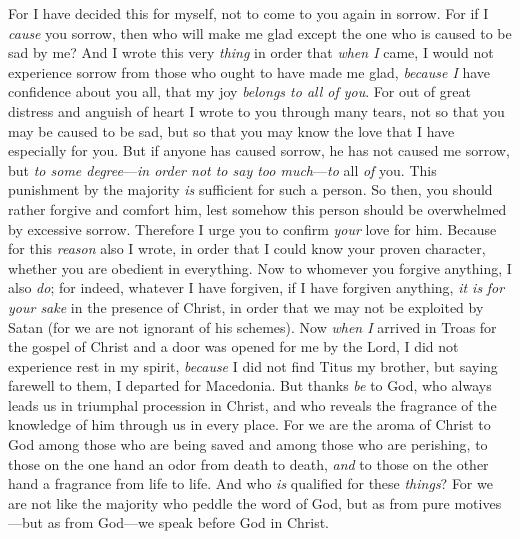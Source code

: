\begin{biblechapter} %
\verse For I have decided this for myself, not to come to you again in sorrow.
\verse For if I \textit{cause} you sorrow, then who will make me glad except the one who is caused to be sad by me?
\verse And I wrote this very \textit{thing} in order that \textit{when I} came, I would not experience sorrow from those who ought to have made me glad, \textit{because I} have confidence about you all, that my joy \textit{belongs to all of you}.
\verse For out of great distress and anguish of heart I wrote to you through many tears, not so that you may be caused to be sad, but so that you may know the love that I have especially for you.
 But if anyone has caused sorrow, he has not caused me sorrow, but \textit{to some degree}—\textit{in order not to say too much}—\textit{to} all \textit{of} you.
\verse This punishment by the majority \textit{is} sufficient for such a person.
\verse So then, you should rather forgive and comfort him, lest somehow this person should be overwhelmed by excessive sorrow.
\verse Therefore I urge you to confirm \textit{your} love for him.
\verse Because for this \textit{reason} also I wrote, in order that I could know your proven character, whether you are obedient in everything.
\verse Now to whomever you forgive anything, I also \textit{do}; for indeed, whatever I have forgiven, if I have forgiven anything, \textit{it is} \textit{for your sake} in the presence of Christ,
\verse in order that we may not be exploited by Satan (for we are not ignorant of his schemes).
 Now \textit{when I} arrived in Troas for the gospel of Christ and a door was opened for me by the Lord,
\verse I did not experience rest in my spirit, \textit{because} I did not find Titus my brother, but saying farewell to them, I departed for Macedonia.
\verse But thanks \textit{be} to God, who always leads us in triumphal procession in Christ, and who reveals the fragrance of the knowledge of him through us in every place.
\verse For we are the aroma of Christ to God among those who are being saved and among those who are perishing,
\verse to those on the one hand an odor from death to death, \textit{and} to those on the other hand a fragrance from life to life. And who \textit{is} qualified for these \textit{things}?
\verse For we are not like the majority who peddle the word of God, but as from pure motives—but as from God—we speak before God in Christ.
\end{biblechapter}

